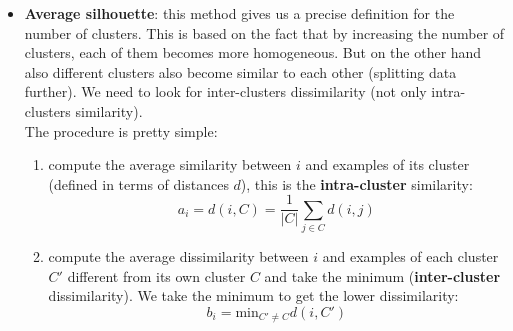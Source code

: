 \begin{itemize}
	\item \textbf{Average silhouette}: this method gives us a precise definition for
		the number of clusters. This is based on the fact that by increasing the
		number of clusters, each of them becomes more homogeneous. But on the other
		hand also different clusters also become similar to each other (splitting data
		further). We need to look for inter-clusters dissimilarity (not only intra-clusters
		similarity).\\ The procedure is pretty simple:
		\begin{enumerate}
			\item compute the average similarity between $i$ and examples of its cluster
				(defined in terms of distances $d$), this is the \textbf{intra-cluster} similarity:
				\[
					a_{i}= d(i, C) = \frac{1}{|C|}\sum_{j \in C}d(i, j)
				\]

			\item compute the average dissimilarity between $i$ and examples of each cluster
				$C'$ different from its own cluster $C$ and take the minimum (\textbf{inter-cluster}
				dissimilarity). We take the minimum to get the lower dissimilarity:
				\[
					b_{i}= \text{min}_{C' \neq C}d(i, C')
				\]


\end{enumerate}
\end{itemize}
